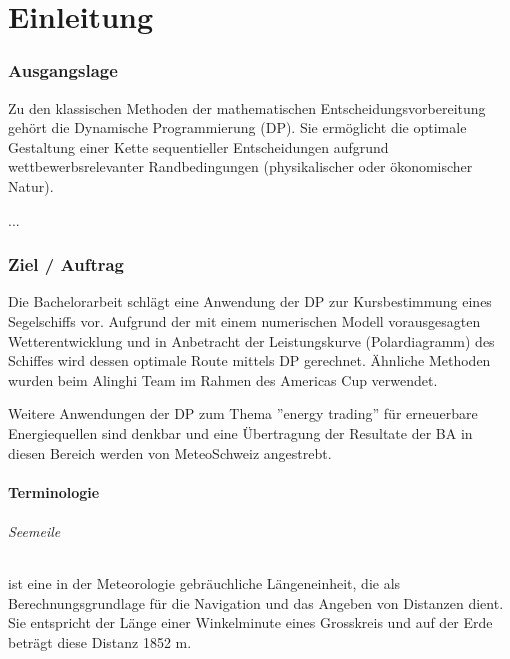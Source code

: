 \documentclass[a4paper,10pt]{article}
\begin{document}
\cleardoublepage
\begingroup
\pagestyle{empty}
\setcounter{tocdepth}{2}
\tableofcontents
\clearpage
\endgroup
       
\newpage

\setcounter{page}{1} 
\part{Einleitung}
\section{Ausgangslage}
Zu den klassischen Methoden der mathematischen Entscheidungsvorbereitung gehört
die Dynamische Programmierung (DP). Sie ermöglicht die optimale Gestaltung
einer Kette sequentieller Entscheidungen aufgrund wettbewerbsrelevanter
Randbedingungen (physikalischer oder ökonomischer Natur).

...


\section{Ziel / Auftrag}
Die Bachelorarbeit schlägt eine Anwendung der DP zur
Kursbestimmung eines Segelschiffs vor. Aufgrund der mit einem
numerischen Modell vorausgesagten Wetterentwicklung und in Anbetracht
der Leistungskurve (Polardiagramm) des Schiffes wird dessen optimale
Route mittels DP gerechnet. Ähnliche Methoden wurden beim Alinghi Team
im Rahmen des Americas Cup verwendet.

Weitere Anwendungen der DP zum Thema ''energy trading'' für erneuerbare
Energiequellen sind denkbar und eine Übertragung der Resultate der BA in
diesen Bereich werden von MeteoSchweiz angestrebt.


\subsection{Terminologie}
\paragraph{Seemeile}ist eine in der Meteorologie gebräuchliche Längeneinheit,
die als Berechnungsgrundlage für die Navigation und das Angeben von Distanzen
dient. Sie entspricht der Länge einer Winkelminute eines Grosskreis und auf der
Erde beträgt diese Distanz 1852 m.
\end{document}
